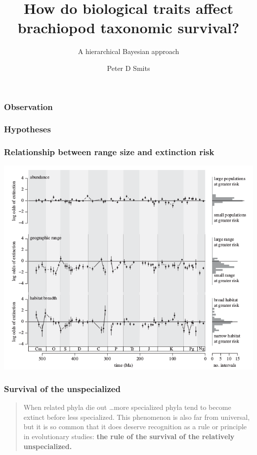 \documentclass{beamer}
\title{How do biological traits affect brachiopod taxonomic survival?}
\subtitle{A hierarchical Bayesian approach}
\author{Peter D Smits}
\institute{Committee on Evolutionary Biology, University of Chicago}
\date{}
\begin{document}
\begin{frame}
  \maketitle
\end{frame}

\begin{frame}
  \frametitle{Observation}
\end{frame}

\begin{frame}
  \frametitle{Hypotheses}
\end{frame}


\begin{frame}
  \frametitle{Relationship between range size and extinction risk}
  \begin{center}
    \includegraphics[width = \textwidth,height = 0.8\textheight,keepaspectratio = true]{figure/harnik_rarity}
  \end{center}
  
  \tiny{}
\end{frame}


\begin{frame}
  \frametitle{Survival of the unspecialized}
  \begin{quote}
    When related phyla die out \dots more specialized phyla tend to become extinct before less specialized. This phenomenon is also far from universal, but it is so common that it does deserve recognition as a rule or principle in evolutionary studies: \textbf{the rule of the survival of the relatively unspecialized.}

    \small{}
  \end{quote}
\end{frame}
\end{document}
